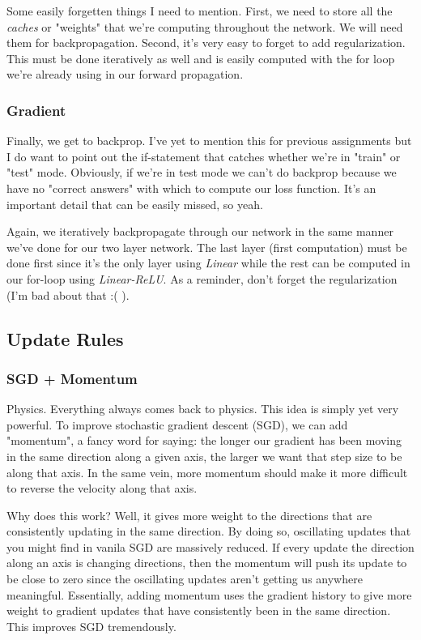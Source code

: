 \documentclass[12pt]{article}
\begin{document}
Some easily forgetten things I need to mention. First, we need to store all the \emph{caches} or 
"weights" that we're computing throughout the network. We will need them for backpropagation. Second, 
it's very easy to forget to add regularization. This must be done iteratively as well and is easily 
computed with the for loop we're already using in our forward propagation. 

\subsubsection{Gradient}
Finally, we get to backprop. I've yet to mention this for previous assignments but I do want to 
point out the if-statement that catches whether  we're in "train" or "test" mode. Obviously, if 
we're in test mode we can't do backprop because we have no "correct answers" with which to 
compute our loss function. It's an important detail that can be easily missed, so yeah. 

Again, we iteratively backpropagate through our network in the same manner we've done for our 
two layer network. The last layer (first computation) must be done first since it's the only 
layer using \emph{Linear} while the rest can be computed in our for-loop using \emph{Linear-ReLU}. 
As a reminder, don't forget the regularization (I'm bad about that :( ). 

\subsection{Update Rules}
\subsubsection{SGD + Momentum}

Physics. Everything always comes back to physics. This idea is simply yet very powerful.
To improve stochastic gradient descent (SGD), we can add "momentum", a fancy word for saying: the
longer our gradient has been moving in the same direction along a given axis, the larger we 
want that step size to be along that axis. In the same vein, more momentum should make it more 
difficult to reverse the velocity along that axis. 

Why does this work? Well, it gives more weight
to the directions that are consistently updating in the same direction. By doing so, oscillating 
updates that you might find in vanila SGD are massively reduced. If every update the direction along
an axis is changing directions, then the momentum will push its update to be close to zero since 
the oscillating updates aren't getting us anywhere meaningful. Essentially, adding momentum 
uses the gradient history to give more weight to gradient updates that have consistently been in 
the same direction. This improves SGD tremendously. 
\end{document}
